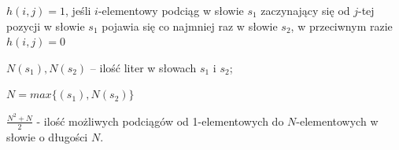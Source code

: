 \documentclass{classrep}
\let\bbordermatrix\bordermatrix
\begin{document}
\begin{enumerate}
$h(i,j) = 1$, jeśli $i$-elementowy podciąg w słowie $s_1$ zaczynający się od $j$-tej pozycji w słowie $s_1$ pojawia się co najmniej raz w  słowie $s_2$, w przeciwnym razie $h(i,j) = 0$

$N(s_1), N(s_2)$ – ilość liter w słowach $s_1$ i $s_2$;

$N = max\{(s_1), N(s_2)\}$

$\frac{N^2+N}{2}$ - ilość możliwych podciągów od 1-elementowych do $N$-elementowych w słowie o długości $N$.
\end{enumerate}

\end{document}
